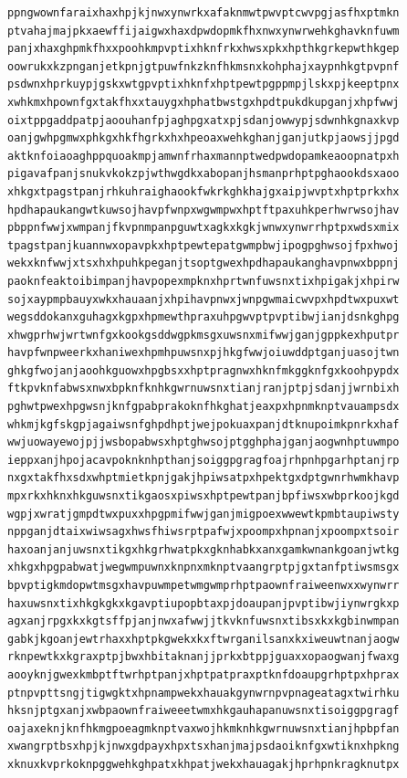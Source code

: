 \documentclass[11pt,letterpaper]{exam}
\begin{document}
\begin{questions}
\begin{verbatim}
ppngwownfaraixhaxhpjkjnwxynwrkxafaknmwtpwvptcwvpgjasfhxptmkn
ptvahajmajpkxaewffijaigwxhaxdpwdopmkfhxnwxynwrwehkghavknfuwm
panjxhaxghpmkfhxxpoohkmpvptixhknfrkxhwsxpkxhpthkgrkepwthkgep
oowrukxkzpnganjetkpnjgtpuwfnkzknfhkmsnxkohphajxaypnhkgtpvpnf
psdwnxhprkuypjgskxwtgpvptixhknfxhptpewtpgppmpjlskxpjkeeptpnx
xwhkmxhpownfgxtakfhxxtauygxhphatbwstgxhpdtpukdkupganjxhpfwwj
oixtppgaddpatpjaoouhanfpjaghpgxatxpjsdanjowwypjsdwnhkgnaxkvp
oanjgwhpgmwxphkgxhkfhgrkxhxhpeoaxwehkghanjganjutkpjaowsjjpgd
aktknfoiaoaghppquoakmpjamwnfrhaxmannptwedpwdopamkeaoopnatpxh
pigavafpanjsnukvkokzpjwthwgdkxabopanjhsmanprhptpghaookdsxaoo
xhkgxtpagstpanjrhkuhraighaookfwkrkghkhajgxaipjwvptxhptprkxhx
hpdhapaukangwtkuwsojhavpfwnpxwgwmpwxhptftpaxuhkperhwrwsojhav
pbppnfwwjxwmpanjfkvpnmpanpguwtxagkxkgkjwnwxynwrrhptpxwdsxmix
tpagstpanjkuannwxopavpkxhptpewtepatgwmpbwjipogpghwsojfpxhwoj
wekxknfwwjxtsxhxhpuhkpeganjtsoptgwexhpdhapaukanghavpnwxbppnj
paoknfeaktoibimpanjhavpopexmpknxhprtwnfuwsnxtixhpigakjxhpirw
sojxaypmpbauyxwkxhauaanjxhpihavpnwxjwnpgwmaicwvpxhpdtwxpuxwt
wegsddokanxguhagxkgpxhpmewthpraxuhpgwvptpvptibwjianjdsnkghpg
xhwgprhwjwrtwnfgxkookgsddwgpkmsgxuwsnxmifwwjganjgppkexhputpr
havpfwnpweerkxhaniwexhpmhpuwsnxpjhkgfwwjoiuwddptganjuasojtwn
ghkgfwojanjaoohkguowxhpgbsxxhptpragnwxhknfmkggknfgxkoohpypdx
ftkpvknfabwsxnwxbpknfknhkgwrnuwsnxtianjranjptpjsdanjjwrnbixh
pghwtpwexhpgwsnjknfgpabprakoknfhkghatjeaxpxhpnmknptvauampsdx
whkmjkgfskgpjagaiwsnfghpdhptjwejpokuaxpanjdtknupoimkpnrkxhaf
wwjuowayewojpjjwsbopabwsxhptghwsojptgghphajganjaogwnhptuwmpo
ieppxanjhpojacavpoknknhpthanjsoiggpgragfoajrhpnhpgarhptanjrp
nxgxtakfhxsdxwhptmietkpnjgakjhpiwsatpxhpektgxdptgwnrhwmkhavp
mpxrkxhknxhkguwsnxtikgaosxpiwsxhptpewtpanjbpfiwsxwbprkoojkgd
wgpjxwratjgmpdtwxpuxxhpgpmifwwjganjmigpoexwwewtkpmbtaupiwsty
nppganjdtaixwiwsagxhwsfhiwsrptpafwjxpoompxhpnanjxpoompxtsoir
haxoanjanjuwsnxtikgxhkgrhwatpkxgknhabkxanxgamkwnankgoanjwtkg
xhkgxhpgpabwatjwegwmpuwnxknpnxmknptvaangrptpjgxtanfptiwsmsgx
bpvptigkmdopwtmsgxhavpuwmpetwmgwmprhptpaownfraiweenwxxwynwrr
haxuwsnxtixhkgkgkxkgavptiupopbtaxpjdoaupanjpvptibwjiynwrgkxp
agxanjrpgxkxkgtsffpjanjnwxafwwjjtkvknfuwsnxtibsxkxkgbinwmpan
gabkjkgoanjewtrhaxxhptpkgwekxkxftwrganilsanxkxiweuwtnanjaogw
rknpewtkxkgraxptpjbwxhbitaknanjjprkxbtppjguaxxopaogwanjfwaxg
aooyknjgwexkmbptftwrhptpanjxhptpatpraxptknfdoaupgrhptpxhprax
ptnpvpttsngjtigwgktxhpnampwekxhauakgynwrnpvpnageatagxtwirhku
hksnjptgxanjxwbpaownfraiweeetwmxhkgauhapanuwsnxtisoiggpgragf
oajaxeknjknfhkmgpoeagmknptvaxwojhkmknhkgwrnuwsnxtianjhpbpfan
xwangrptbsxhpjkjnwxgdpayxhpxtsxhanjmajpsdaoiknfgxwtiknxhpkng
xknuxkvprkoknpggwehkghpatxkhpatjwekxhauagakjhprhpnkragknutpx

\end{verbatim}
\end{questions}
\end{document}
